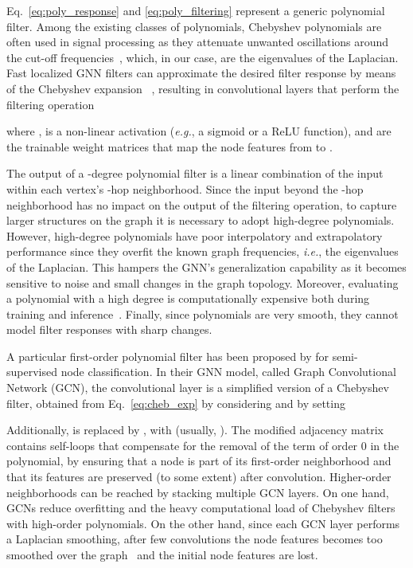 \documentclass{article}
\begin{document}
Eq.~\eqref{eq:poly_response} and \eqref{eq:poly_filtering} represent a generic polynomial filter.
Among the existing classes of polynomials, Chebyshev polynomials are often used in signal processing as they attenuate unwanted oscillations around the cut-off frequencies~\cite{shuman2011chebyshev}, which, in our case, are the eigenvalues of the Laplacian.
Fast localized GNN filters can approximate the desired filter response by means of the Chebyshev expansion ~\cite{defferrard2016convolutional}, resulting in convolutional layers that perform the filtering operation

where ,  is a non-linear activation (\emph{e.g.}, a sigmoid or a ReLU function), and  are the  trainable weight matrices that map the node features from  to .


The output of a -degree polynomial filter is a linear combination of the input within each vertex's -hop neighborhood. 
Since the input beyond the -hop neighborhood has no impact on the output of the filtering operation, to capture larger structures on the graph it is necessary to adopt high-degree polynomials. 
However, high-degree polynomials have poor interpolatory and extrapolatory performance since they overfit the known graph frequencies, \emph{i.e.}, the eigenvalues of the Laplacian.
This hampers the GNN's generalization capability as it becomes sensitive to noise and small changes in the graph topology.
Moreover, evaluating a polynomial with a high degree is computationally expensive both during training and inference~\cite{isufi2016autoregressive}.
Finally, since polynomials are very smooth, they cannot model filter responses with sharp changes.

A particular first-order polynomial filter has been proposed by \cite{kipf2016semi} for semi-supervised node classification.
In their GNN model, called Graph Convolutional Network (GCN), the convolutional layer is a simplified version of a Chebyshev filter, obtained from Eq.~\eqref{eq:cheb_exp} by considering  and by setting 

Additionally,  is replaced by , with  (usually, ).
The modified adjacency matrix  contains self-loops that compensate for the removal of the term of order 0 in the polynomial, by ensuring that a node is part of its first-order neighborhood and that its features are preserved (to some extent) after convolution.
Higher-order neighborhoods can be reached by stacking multiple GCN layers.
On one hand, GCNs reduce overfitting and the heavy computational load of Chebyshev filters with high-order polynomials.
On the other hand, since each GCN layer performs a Laplacian smoothing, after few convolutions the node features becomes too smoothed over the graph~\cite{li2018deeper} and the initial node features are lost.
\end{document}
